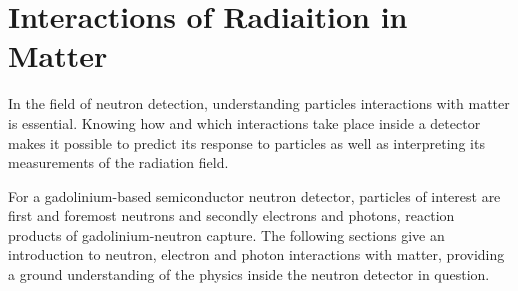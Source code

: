 \chapter{Interactions of Radiaition in Matter}
\label{chap:Interaction}

In the field of neutron detection, understanding particles interactions with matter is essential. Knowing how and which interactions take place inside a detector makes it possible to predict its response to particles as well as interpreting its measurements of the radiation field.

For a gadolinium-based semiconductor neutron detector, particles of interest are first and foremost neutrons and secondly electrons and photons, reaction products of gadolinium-neutron capture. The following sections give an introduction to neutron, electron and photon interactions with matter, providing a ground understanding of the physics inside the neutron detector in question.





